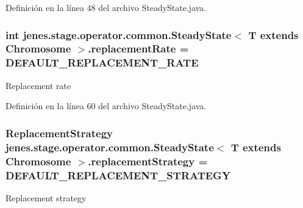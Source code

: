 Definición en la línea 48 del archivo Steady\-State.\-java.

\hypertarget{classjenes_1_1stage_1_1operator_1_1common_1_1_steady_state_3_01_t_01extends_01_chromosome_01_4_a84dd70ced0dad9433e4168f18eb735f9}{
\subsubsection[{replacement\-Rate}]{\setlength{\rightskip}{0pt plus 5cm}int jenes.\-stage.\-operator.\-common.\-Steady\-State$<$ T extends Chromosome $>$.replacement\-Rate = {\bf D\-E\-F\-A\-U\-L\-T\-\_\-\-R\-E\-P\-L\-A\-C\-E\-M\-E\-N\-T\-\_\-\-R\-A\-T\-E}\hspace{0.3cm}{\ttfamily [protected]}}}\label{classjenes_1_1stage_1_1operator_1_1common_1_1_steady_state_3_01_t_01extends_01_chromosome_01_4_a84dd70ced0dad9433e4168f18eb735f9}
Replacement rate 

Definición en la línea 60 del archivo Steady\-State.\-java.

\hypertarget{classjenes_1_1stage_1_1operator_1_1common_1_1_steady_state_3_01_t_01extends_01_chromosome_01_4_a4d727adbb35eaad5d78fc59abaabea0c}{
\subsubsection[{replacement\-Strategy}]{\setlength{\rightskip}{0pt plus 5cm}Replacement\-Strategy jenes.\-stage.\-operator.\-common.\-Steady\-State$<$ T extends Chromosome $>$.replacement\-Strategy = {\bf D\-E\-F\-A\-U\-L\-T\-\_\-\-R\-E\-P\-L\-A\-C\-E\-M\-E\-N\-T\-\_\-\-S\-T\-R\-A\-T\-E\-G\-Y}\hspace{0.3cm}{\ttfamily [protected]}}}\label{classjenes_1_1stage_1_1operator_1_1common_1_1_steady_state_3_01_t_01extends_01_chromosome_01_4_a4d727adbb35eaad5d78fc59abaabea0c}
Replacement strategy 

